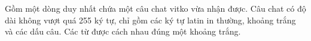 Gồm một dòng duy nhất chứa một câu chat vitko vừa nhận được. Câu chat có độ dài không vượt quá 255 ký tự, chỉ gồm các ký tự latin in thường, khoảng trắng và các dấu câu. Các từ được cách nhau đúng một khoảng trắng.  

\